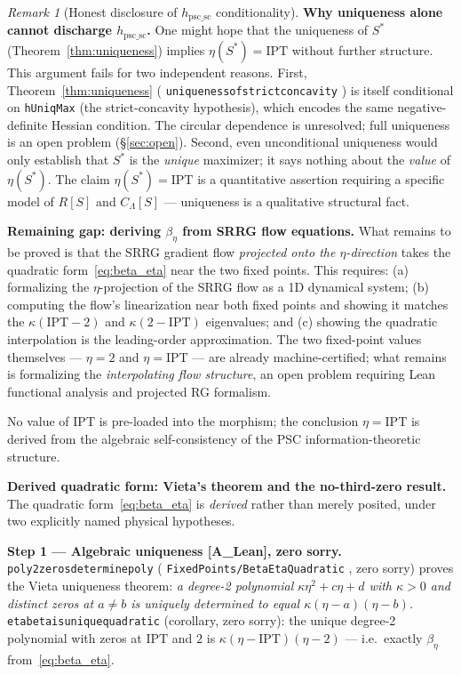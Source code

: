 \documentclass[11pt]{article}
\theoremstyle{remark}
\newtheorem{remark}[theorem]{Remark}
\newcommand{\IPT}{\mathrm{IPT}}
\newcommand{\lean}[1]{%
  \penalty-100
  \begingroup
  \def\_{\textunderscore\allowbreak}%
  \texttt{#1}%
  \endgroup
}
\newcommand{\Sstar}{S^*}
\begin{document}
\begin{remark}[Honest disclosure of $h_{\mathrm{psc\_sc}}$ conditionality]
\textbf{Why uniqueness alone cannot discharge $h_{\mathrm{psc\_sc}}$.}
One might hope that the uniqueness of $\Sstar$
(Theorem~\ref{thm:uniqueness}) implies $\eta(\Sstar) = \IPT$ without further
structure. This argument fails for two independent reasons.
First, Theorem~\ref{thm:uniqueness} (\lean{uniqueness\_of\_strict\_concavity}) is
itself conditional on \lean{hUniqMax} (the strict-concavity hypothesis), which
encodes the same negative-definite Hessian condition.  The circular dependence is
unresolved; full uniqueness is an open problem (§\ref{sec:open}).
Second, even unconditional uniqueness would only establish that $\Sstar$ is the
\emph{unique} maximizer; it says nothing about the \emph{value} of $\eta(\Sstar)$.
The claim $\eta(\Sstar) = \IPT$ is a quantitative assertion requiring a specific
model of $R[S]$ and $C_\Lambda[S]$ — uniqueness is a qualitative structural fact.

\textbf{Remaining gap: deriving $\beta_\eta$ from SRRG flow equations.}
What remains to be proved is that the SRRG gradient flow \emph{projected onto the
$\eta$-direction} takes the quadratic form~\eqref{eq:beta_eta} near the two fixed
points.  This requires:
(a) formalizing the $\eta$-projection of the SRRG flow as a 1D dynamical system;
(b) computing the flow's linearization near both fixed points and showing it matches
the $\kappa(\IPT - 2)$ and $\kappa(2 - \IPT)$ eigenvalues; and
(c) showing the quadratic interpolation is the leading-order approximation.
The two fixed-point values themselves --- $\eta = 2$ and $\eta = \IPT$ --- are already
machine-certified; what remains is formalizing the \emph{interpolating flow structure},
an open problem requiring Lean functional analysis and projected RG formalism.

No value of $\IPT$ is pre-loaded into the morphism; the conclusion $\eta = \IPT$ is
derived from the algebraic self-consistency of the PSC information-theoretic structure.

\textbf{Derived quadratic form: Vieta's theorem and the no-third-zero result.}
The quadratic form~\eqref{eq:beta_eta} is \emph{derived} rather than merely posited,
under two explicitly named physical hypotheses.

\textbf{Step 1 — Algebraic uniqueness [A\_Lean], zero sorry.}
\lean{poly2\_zeros\_determine\_poly} (\lean{FixedPoints/BetaEtaQuadratic}, zero sorry)
proves the Vieta uniqueness theorem: \emph{a degree-2 polynomial $\kappa\eta^2 + c\eta + d$
with $\kappa > 0$ and distinct zeros at $a \neq b$ is uniquely determined to equal
$\kappa(\eta - a)(\eta - b)$.}
\lean{eta\_beta\_is\_unique\_quadratic} (corollary, zero sorry): the unique degree-2
polynomial with zeros at $\IPT$ and $2$ is $\kappa(\eta - \IPT)(\eta - 2)$ — i.e.\ exactly
$\beta_\eta$ from~\eqref{eq:beta_eta}.


\end{remark}
\end{document}
